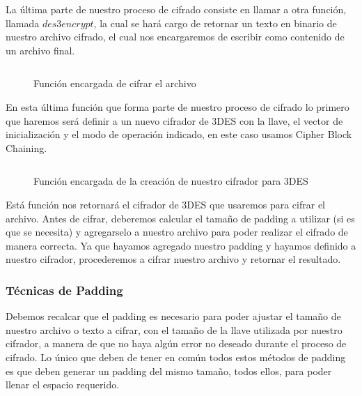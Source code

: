 \documentclass[10pt]{article}
\begin{document}
		La última parte de nuestro proceso de cifrado consiste en llamar a otra función, llamada $des3encrypt$, la cual se hará cargo de retornar un texto en binario de nuestro archivo cifrado, el cual nos encargaremos de escribir como contenido de un archivo final.

		\begin{figure}[H]
			\inputminted[linenos, firstnumber=1, breaklines, tabsize=4, firstline=147, lastline=152]{python}{code/App.py}
			\caption{Función encargada de cifrar el archivo}
		\end{figure}

		En esta última función que forma parte de nuestro proceso de cifrado lo primero que haremos será definir a un nuevo cifrador de 3DES con la llave, el vector de inicialización y el modo de operación indicado, en este caso usamos Cipher Block Chaining.

		\begin{figure}[H]
			\inputminted[linenos, firstnumber=1, breaklines, tabsize=4, firstline=143, lastline=145]{python}{code/App.py}
			\caption{Función encargada de la creación de nuestro cifrador para 3DES}
		\end{figure}

		Está función nos retornará el cifrador de 3DES que usaremos para cifrar el archivo. Antes de cifrar, deberemos calcular el tamaño de padding a utilizar (si es que se necesita) y agregarselo a nuestro archivo para poder realizar el cifrado de manera correcta. Ya que hayamos agregado nuestro padding y hayamos definido a nuestro cifrador, procederemos a cifrar nuestro archivo y retornar el resultado.


   	\subsubsection*{Técnicas de Padding}
   		Debemos recalcar que el padding es necesario para poder ajustar el tamaño de nuestro archivo o texto a cifrar, con el tamaño de la llave utilizada por nuestro cifrador, a manera de que no haya algún error no deseado durante el proceso de cifrado. Lo único que deben de tener en común todos estos métodos de padding es que deben generar un padding del mismo tamaño, todos ellos, para poder llenar el espacio requerido. 
\end{document}
